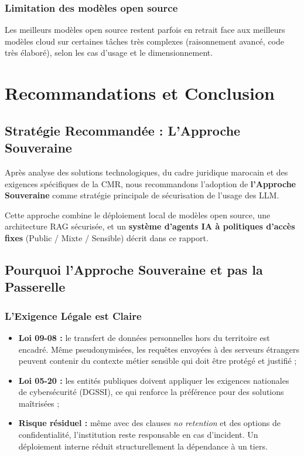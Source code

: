\documentclass[12pt, a4paper]{report}
\begin{document}
\subsubsection{Limitation des modèles open source}

Les meilleurs modèles open source restent parfois en retrait face aux
meilleurs modèles cloud sur certaines tâches très complexes (raisonnement
avancé, code très élaboré), selon les cas d'usage et le dimensionnement.

\newpage

\section{Recommandations et Conclusion}

\subsection{Stratégie Recommandée : L'Approche Souveraine}

Après analyse des solutions technologiques, du cadre juridique marocain
et des exigences spécifiques de la CMR, nous recommandons l'adoption de
\textbf{l'Approche Souveraine} comme stratégie principale de sécurisation
de l'usage des LLM.

Cette approche combine le déploiement local de modèles open source, une
architecture RAG sécurisée, et un \textbf{système d'agents IA à politiques
d'accès fixes} (Public / Mixte / Sensible) décrit dans ce rapport.

\subsection{Pourquoi l'Approche Souveraine et pas la Passerelle}

\subsubsection{L'Exigence Légale est Claire}

\begin{itemize}
  \item \textbf{Loi 09-08 :} le transfert de données personnelles hors
        du territoire est encadré. Même pseudonymisées, les requêtes
        envoyées à des serveurs étrangers peuvent contenir du contexte
        métier sensible qui doit être protégé et justifié ;
  \item \textbf{Loi 05-20 :} les entités publiques doivent appliquer les
        exigences nationales de cybersécurité (DGSSI), ce qui renforce
        la préférence pour des solutions maîtrisées ;
  \item \textbf{Risque résiduel :} même avec des clauses
        \textit{no retention} et des options de confidentialité,
        l'institution reste responsable en cas d'incident. Un déploiement
        interne réduit structurellement la dépendance à un tiers.
\end{itemize}
\end{document}
